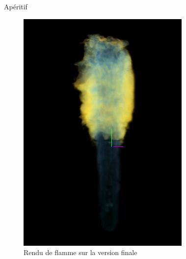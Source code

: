 \documentclass{beamer}
\begin{document}
\begin{frame}{Apéritif}
  \begin{figure}[h]
    \centering\includegraphics[scale=0.3]{FlammeBleue.jpg}
    \caption{Rendu de flamme sur la version finale}
    \label{ProjectionStam}
  \end{figure}
\end{frame}
\end{document}
